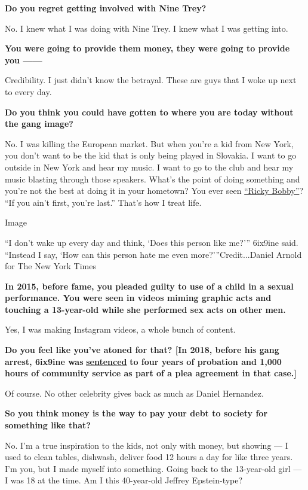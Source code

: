 \textbf{Do you regret getting involved with Nine Trey?}

No. I knew what I was doing with Nine Trey. I knew what I was getting
into.

\textbf{You were going to provide them money, they were going to provide
you ------}

Credibility. I just didn't know the betrayal. These are guys that I woke
up next to every day.

\textbf{Do you think you could have gotten to where you are today
without the gang image?}

No. I was killing the European market. But when you're a kid from New
York, you don't want to be the kid that is only being played in
Slovakia. I want to go outside in New York and hear my music. I want to
go to the club and hear my music blasting through those speakers. What's
the point of doing something and you're not the best at doing it in your
hometown? You ever seen
\href{https://www.imdb.com/title/tt0415306/}{``Ricky Bobby''}? ``If you
ain't first, you're last.'' That's how I treat life.

Image

``I don't wake up every day and think, `Does this person like me?'''
6ix9ine said. ``Instead I say, `How can this person hate me even
more?'''Credit...Daniel Arnold for The New York Times

\textbf{In 2015, before fame, you pleaded guilty to use of a child in a
sexual performance. You were seen in videos miming graphic acts and
touching a 13-year-old while she performed sex acts on other men.}

Yes, I was making Instagram videos, a whole bunch of content.

\textbf{Do you feel like you've atoned for that? {[}In 2018, before his
gang arrest, 6ix9ine was}
\textbf{\href{https://www.nytimes3xbfgragh.onion/2018/10/26/arts/tekashi-6ix9ine-sentencing-probation.html}{sentenced}}
\textbf{to four years of probation and 1,000 hours of community service
as part of a plea agreement in that case.{]}}

Of course. No other celebrity gives back as much as Daniel Hernandez.

\textbf{So you think money is the way to pay your debt to society for
something like that?}

No. I'm a true inspiration to the kids, not only with money, but showing
--- I used to clean tables, dishwash, deliver food 12 hours a day for
like three years. I'm you, but I made myself into something. Going back
to the 13-year-old girl --- I was 18 at the time. Am I this 40-year-old
Jeffrey Epstein-type?

